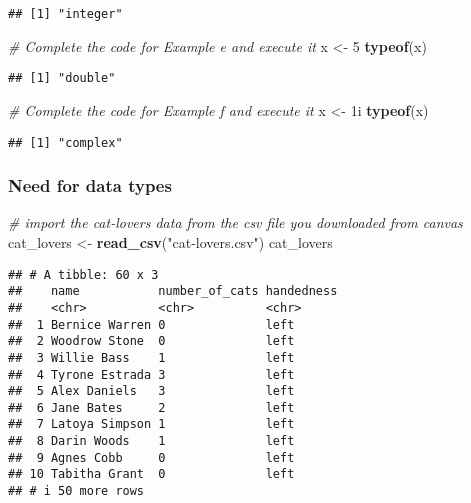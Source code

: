 \documentclass[
]{article}
\newenvironment{Shaded}{\begin{snugshade}}{\end{snugshade}}
\newcommand{\CommentTok}[1]{\textcolor[rgb]{0.56,0.35,0.01}{\textit{#1}}}
\newcommand{\DecValTok}[1]{\textcolor[rgb]{0.00,0.00,0.81}{#1}}
\newcommand{\FunctionTok}[1]{\textcolor[rgb]{0.13,0.29,0.53}{\textbf{#1}}}
\newcommand{\NormalTok}[1]{#1}
\newcommand{\OtherTok}[1]{\textcolor[rgb]{0.56,0.35,0.01}{#1}}
\newcommand{\StringTok}[1]{\textcolor[rgb]{0.31,0.60,0.02}{#1}}
\begin{document}
\begin{verbatim}
## [1] "integer"
\end{verbatim}

\begin{Shaded}
\begin{Highlighting}[]
\CommentTok{\# Complete the code for Example e and execute it}
\NormalTok{x }\OtherTok{\textless{}{-}} \DecValTok{5}
\FunctionTok{typeof}\NormalTok{(x)}
\end{Highlighting}
\end{Shaded}

\begin{verbatim}
## [1] "double"
\end{verbatim}

\begin{Shaded}
\begin{Highlighting}[]
\CommentTok{\# Complete the code for Example f and execute it}
\NormalTok{x }\OtherTok{\textless{}{-}}\NormalTok{ 1i}
\FunctionTok{typeof}\NormalTok{(x)}
\end{Highlighting}
\end{Shaded}

\begin{verbatim}
## [1] "complex"
\end{verbatim}

\hypertarget{need-for-data-types}{%
\subsubsection{Need for data types}\label{need-for-data-types}}

\begin{Shaded}
\begin{Highlighting}[]
\CommentTok{\# import the cat{-}lovers data from the csv file you downloaded from canvas}
\NormalTok{cat\_lovers }\OtherTok{\textless{}{-}} \FunctionTok{read\_csv}\NormalTok{(}\StringTok{"cat{-}lovers.csv"}\NormalTok{)}
\NormalTok{cat\_lovers}
\end{Highlighting}
\end{Shaded}

\begin{verbatim}
## # A tibble: 60 x 3
##    name           number_of_cats handedness
##    <chr>          <chr>          <chr>     
##  1 Bernice Warren 0              left      
##  2 Woodrow Stone  0              left      
##  3 Willie Bass    1              left      
##  4 Tyrone Estrada 3              left      
##  5 Alex Daniels   3              left      
##  6 Jane Bates     2              left      
##  7 Latoya Simpson 1              left      
##  8 Darin Woods    1              left      
##  9 Agnes Cobb     0              left      
## 10 Tabitha Grant  0              left      
## # i 50 more rows
\end{verbatim}
\end{document}
